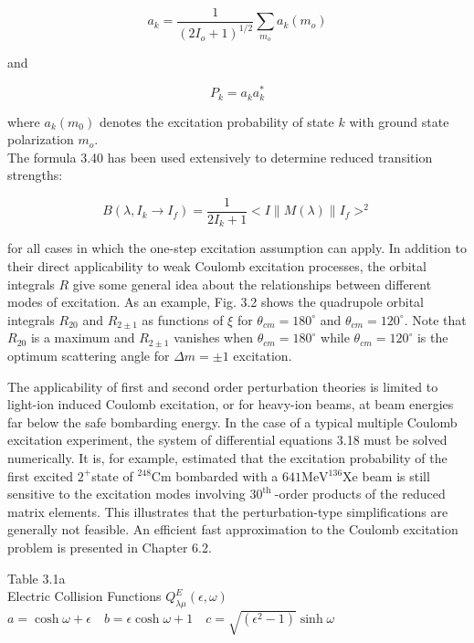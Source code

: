 \documentclass[10pt]{article}
\begin{document}
\begin{equation*}
a_{k}=\frac{1}{\left(2 I_{o}+1\right)^{1 / 2}} \sum_{m_{o}} a_{k}\left(m_{o}\right) \tag{3.42}
\end{equation*}


and


\begin{equation*}
P_{k}=a_{k} a_{k}^{*} \tag{3.43}
\end{equation*}


where $a_{k}\left(m_{0}\right)$ denotes the excitation probability of state $k$ with ground state polarization $m_{o}$.\\
The formula 3.40 has been used extensively to determine reduced transition strengths:


\begin{equation*}
B\left(\lambda, I_{k} \rightarrow I_{f}\right)=\frac{1}{2 I_{k}+1}<I\|M(\lambda)\| I_{f}>^{2} \tag{3.44}
\end{equation*}


for all cases in which the one-step excitation assumption can apply. In addition to their direct applicability to weak Coulomb excitation processes, the orbital integrals $R$ give some general idea about the relationships between different modes of excitation. As an example, Fig. 3.2 shows the quadrupole orbital integrals $R_{20}$ and $R_{2 \pm 1}$ as functions of $\xi$ for $\theta_{c m}=180^{\circ}$ and $\theta_{c m}=120^{\circ}$. Note that $R_{20}$ is a maximum and $R_{2 \pm 1}$ vanishes when $\theta_{c m}=180^{\circ}$ while $\theta_{c m}=120^{\circ}$ is the optimum scattering angle for $\Delta m= \pm 1$ excitation.

The applicability of first and second order perturbation theories is limited to light-ion induced Coulomb excitation, or for heavy-ion beams, at beam energies far below the safe bombarding energy. In the case of a typical multiple Coulomb excitation experiment, the system of differential equations 3.18 must be solved numerically. It is, for example, estimated that the excitation probability of the first excited $2^{+}$state of ${ }^{248} \mathrm{Cm}$ bombarded with a $641 \mathrm{MeV}{ }^{136} \mathrm{Xe}$ beam is still sensitive to the excitation modes involving $30^{\text {th }}$-order products of the reduced matrix elements. This illustrates that the perturbation-type simplifications are generally not feasible. An efficient fast approximation to the Coulomb excitation problem is presented in Chapter 6.2.

Table 3.1a\\
Electric Collision Functions $Q_{\lambda \mu}^{E}(\epsilon, \omega)$\\
$a=\cosh \omega+\epsilon \quad b=\epsilon \cosh \omega+1 \quad c=\sqrt{\left(\epsilon^{2}-1\right)} \sinh \omega$
\end{document}
